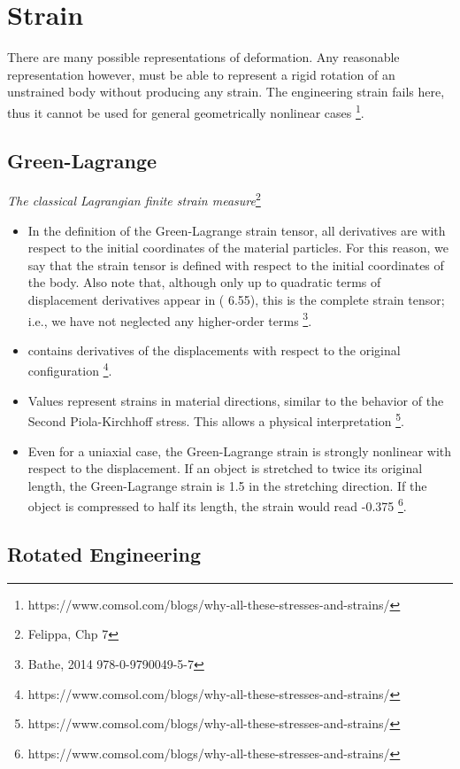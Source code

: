 \hypertarget{strain}{%
\section{Strain}\label{strain}}

There are many possible representations of deformation. Any reasonable
representation however, must be able to represent a rigid rotation of an
unstrained body without producing any strain. The engineering strain
fails here, thus it cannot be used for general geometrically nonlinear
cases \footnote{https://www.comsol.com/blogs/why-all-these-stresses-and-strains/}.

\hypertarget{green-lagrange}{%
\subsection{Green-Lagrange}\label{green-lagrange}}

\emph{The classical Lagrangian finite strain measure}\footnote{Felippa,
  Chp 7}

\begin{itemize}
\item
  In the definition of the Green-Lagrange strain tensor, all derivatives
  are with respect to the initial coordinates of the material particles.
  For this reason, we say that the strain tensor is defined with respect
  to the initial coordinates of the body. Also note that, although only
  up to quadratic terms of displacement derivatives appear in ( 6.55),
  this is the complete strain tensor; i.e., we have not neglected any
  higher-order terms \footnote{Bathe, 2014 978-0-9790049-5-7}.
\item
  contains derivatives of the displacements with respect to the original
  configuration \footnote{https://www.comsol.com/blogs/why-all-these-stresses-and-strains/}.
\item
  Values represent strains in material directions, similar to the
  behavior of the Second Piola-Kirchhoff stress. This allows a physical
  interpretation \footnote{https://www.comsol.com/blogs/why-all-these-stresses-and-strains/}.
\item
  Even for a uniaxial case, the Green-Lagrange strain is strongly
  nonlinear with respect to the displacement. If an object is stretched
  to twice its original length, the Green-Lagrange strain is 1.5 in the
  stretching direction. If the object is compressed to half its length,
  the strain would read -0.375 \footnote{https://www.comsol.com/blogs/why-all-these-stresses-and-strains/}.
\end{itemize}

\hypertarget{rotated-engineering}{%
\subsection{Rotated Engineering}\label{rotated-engineering}}
